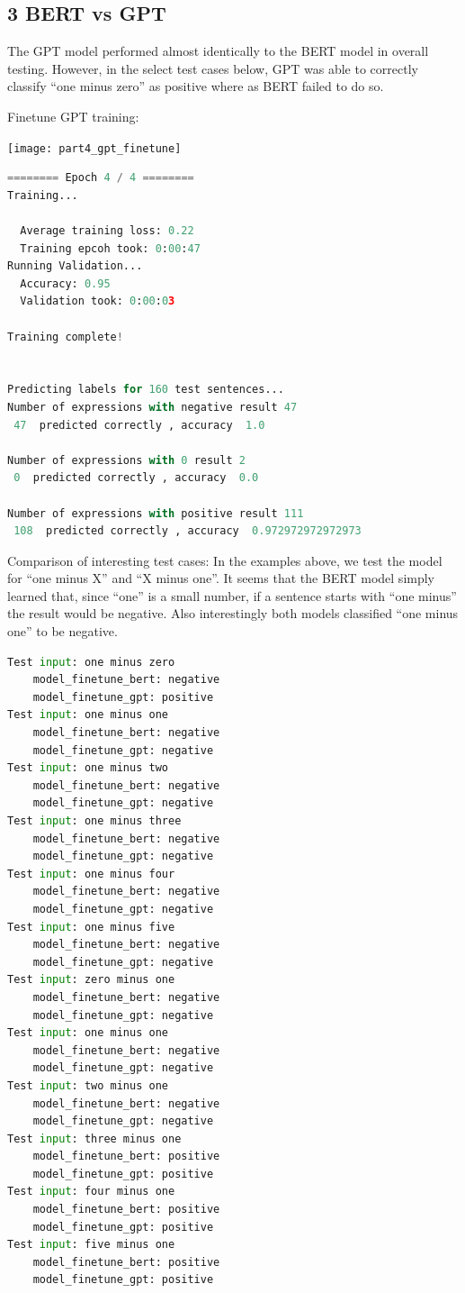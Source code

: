 \documentclass{article}
\begin{document}
\subsection*{3 BERT vs GPT}

The GPT model performed almost identically to the BERT model in overall testing. However, in the select test cases below, GPT was able to correctly classify ``one minus zero'' as positive where as BERT failed to do so.

Finetune GPT training:

\texttt{[image: part4\_gpt\_finetune]}

\begin{lstlisting}[language=Python]
======== Epoch 4 / 4 ========
Training...

  Average training loss: 0.22
  Training epcoh took: 0:00:47
Running Validation...
  Accuracy: 0.95
  Validation took: 0:00:03

Training complete!


Predicting labels for 160 test sentences...
Number of expressions with negative result 47 
 47  predicted correctly , accuracy  1.0 

Number of expressions with 0 result 2 
 0  predicted correctly , accuracy  0.0 

Number of expressions with positive result 111 
 108  predicted correctly , accuracy  0.972972972972973 

\end{lstlisting}


Comparison of interesting test cases: In the examples above, we test the model for ``one minus X'' and ``X minus one''. It seems that the BERT model simply learned that, since ``one'' is a small number, if a sentence starts with ``one minus'' the result would be negative. Also interestingly both models classified ``one minus one'' to be negative. 


\begin{lstlisting}[language=Python]
Test input: one minus zero
    model_finetune_bert: negative
    model_finetune_gpt: positive
Test input: one minus one
    model_finetune_bert: negative
    model_finetune_gpt: negative
Test input: one minus two
    model_finetune_bert: negative
    model_finetune_gpt: negative
Test input: one minus three
    model_finetune_bert: negative
    model_finetune_gpt: negative
Test input: one minus four
    model_finetune_bert: negative
    model_finetune_gpt: negative
Test input: one minus five
    model_finetune_bert: negative
    model_finetune_gpt: negative
Test input: zero minus one
    model_finetune_bert: negative
    model_finetune_gpt: negative
Test input: one minus one
    model_finetune_bert: negative
    model_finetune_gpt: negative
Test input: two minus one
    model_finetune_bert: negative
    model_finetune_gpt: negative
Test input: three minus one
    model_finetune_bert: positive
    model_finetune_gpt: positive
Test input: four minus one
    model_finetune_bert: positive
    model_finetune_gpt: positive
Test input: five minus one
    model_finetune_bert: positive
    model_finetune_gpt: positive

\end{lstlisting}
\end{document}
